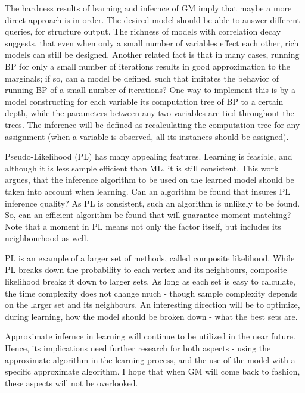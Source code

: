 The hardness results of learning and infernce of GM imply that maybe a more direct approach is in order.
The desired model should be able to answer different queries, for structure output.
The richness of models with correlation decay suggests, that even when only a small number of variables effect each other, rich models can still be designed.
Another related fact is that in many cases, running BP for only a small number of iterations results in good approximation to the marginals;
if so, can a model be defined, such that imitates the behavior of running BP of a small number of iterations?
One way to implement this is by a model constructing for each variable its computation tree of BP to a certain depth,
while the parameters between any two variables are tied throughout the trees.
The inference will be defined as recalculating the computation tree for any assignment (when a variable is observed, all its instances should be assigned).


Pseudo-Likelihood (PL) has many appealing features.
Learning is feasible, and although it is less sample efficient than ML, it is still consistent.
This work argues, that the inference algorithm to be used on the learned model should be taken into account when learning.
Can an algorithm be found that insures PL inference quality?
As PL is consistent, such an algorithm is unlikely to be found.
So, can an efficient algorithm be found that will guarantee moment matching?
Note that a moment in PL means not only the factor itself, but includes its neighbourhood as well.

PL is an example of a larger set of methods, called composite likelihood.
While PL breaks down the probability to each vertex and its neighbours, composite likelihood breaks it down to larger sets.
As long as each set is easy to calculate, the time complexity does not change much - though sample complexity depends on the larger set and its neighbours.
An interesting direction will be to optimize, during learning, how the model should be broken down - what the best sets are.

Approximate infernce in learning will continue to be utilized in the near future.
Hence, its implications need further research for both aspects -  using the approximate algorithm in the learning process, and the use of the model with a specific approximate algorithm.
I hope that when GM will come back to fashion, these aspects will not be overlooked.

